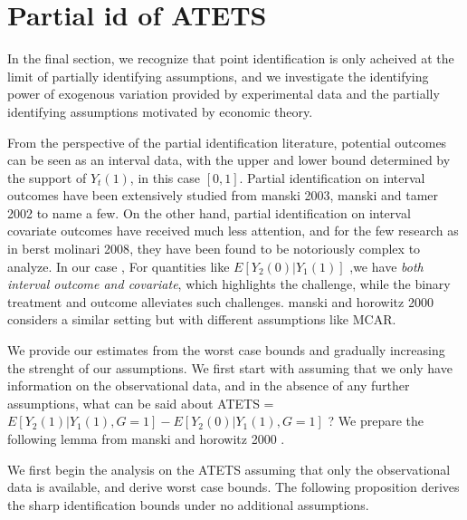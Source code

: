 \documentclass[uplatex,dvipdfmx]{jsarticle}
\begin{document}
\section{Partial id of ATETS}

    In the final section, we recognize that point identification is only acheived at the limit of partially identifying assumptions, and we investigate the identifying power of exogenous variation provided by experimental data and the partially identifying assumptions motivated by economic theory.


From the perspective of the partial identification literature, potential outcomes can be seen as an interval data, with the upper and lower bound determined by the support of $Y_t(1)$, in this case $[0,1]$. Partial identification on interval outcomes have been extensively studied from %
{manski 2003, manski and tamer 2002} to name a few. On the other hand, partial identification on interval covariate outcomes have received much less attention, and for the few research as in %
{berst molinari 2008}, they have been found to be notoriously complex to analyze. In our case , For quantities like $E[ Y _2(0) | Y_1(1) ]$ ,we have \textit{both interval outcome and covariate}, which highlights the challenge, while the  binary treatment and outcome alleviates such challenges. %
{manski and horowitz 2000} considers a similar setting but with different assumptions like MCAR.

We provide our estimates from the worst case bounds and gradually increasing the strenght of our assumptions.  We first start with assuming that we only have information on the observational data, and in the absence of any further assumptions, what can be said about ATETS = $E[ Y_2(1) | Y_1(1) , G =1 ] - E[ Y_2(0) | Y_1(1), G =1]$ ? We prepare the following lemma from %
{manski and horowitz 2000} .




We first begin the analysis on the ATETS assuming that only the observational data is available, and derive worst case bounds. The following proposition derives the sharp identification bounds under no additional assumptions.
\end{document}
